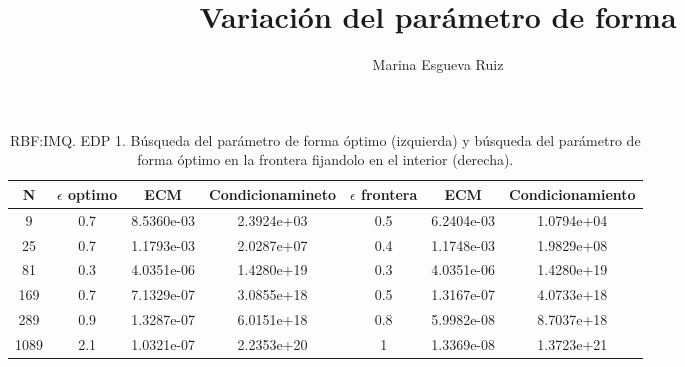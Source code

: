 \documentclass[11pt,a4paper]{article}
\author{Marina Esgueva Ruiz}
\title{Variación del parámetro de forma}
\begin{document}
\begin{table}
\begin{center}
\caption{RBF:IMQ.  EDP 1. Búsqueda del parámetro de forma óptimo (izquierda) y búsqueda del parámetro de forma óptimo en la frontera fijandolo en el interior (derecha).}
\begin{tabular}{|c|ccc|ccc|}
\hline 
N & $\epsilon$ optimo & ECM & Condicionamineto & $\epsilon$ frontera & ECM & Condicionamiento \\ 
\hline 
9 & 0.7 & 8.5360e-03 & 2.3924e+03 & 0.5 & 6.2404e-03 & 1.0794e+04 \\ 
25 & 0.7& 1.1793e-03&2.0287e+07& 0.4& 1.1748e-03&1.9829e+08 \\
81& 0.3& 4.0351e-06& 1.4280e+19& 0.3& 4.0351e-06 & 1.4280e+19\\
169& 0.7&7.1329e-07& 3.0855e+18& 0.5 & 1.3167e-07 & 4.0733e+18 \\
289&0.9 & 1.3287e-07&  6.0151e+18& 0.8 & 5.9982e-08& 8.7037e+18\\
1089&2.1& 1.0321e-07& 2.2353e+20& 1& 1.3369e-08&1.3723e+21\\
\hline
\end{tabular}
\label{edp1} 
\end{center}
\end{table}
\end{document}
